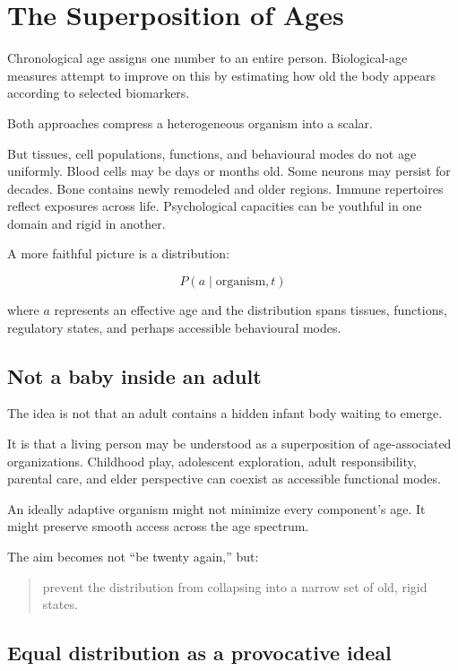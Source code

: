 \chapter{The Superposition of Ages}

Chronological age assigns one number to an entire person. Biological-age measures attempt to improve on this by estimating how old the body appears according to selected biomarkers.

Both approaches compress a heterogeneous organism into a scalar.

But tissues, cell populations, functions, and behavioural modes do not age uniformly. Blood cells may be days or months old. Some neurons may persist for decades. Bone contains newly remodeled and older regions. Immune repertoires reflect exposures across life. Psychological capacities can be youthful in one domain and rigid in another.

A more faithful picture is a distribution:

\[
P(a \mid \text{organism}, t)
\]

where \(a\) represents an effective age and the distribution spans tissues, functions, regulatory states, and perhaps accessible behavioural modes.

\section{Not a baby inside an adult}

The idea is not that an adult contains a hidden infant body waiting to emerge.

It is that a living person may be understood as a superposition of age-associated organizations. Childhood play, adolescent exploration, adult responsibility, parental care, and elder perspective can coexist as accessible functional modes.

An ideally adaptive organism might not minimize every component's age. It might preserve smooth access across the age spectrum.

The aim becomes not ``be twenty again,'' but:

\begin{quote}
prevent the distribution from collapsing into a narrow set of old, rigid states.
\end{quote}

\section{Equal distribution as a provocative ideal}

